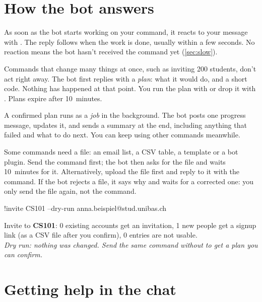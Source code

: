 \section{How the bot answers}
\label{sec:answers}

\begin{description}[style=nextline,leftmargin=1.5em,font=\normalfont\bfseries]
  \item[\robot\ The robot reaction]
    As soon as the bot starts working on your command, it reacts to your message with
    \robot. The reply follows when the work is done, usually within a few seconds.
    No reaction means the bot hasn't received the command yet (\autoref{sec:slow}).
  \item[Plans and \cmd{!confirm}]
    Commands that change many things at once, such as inviting 200 students, don't act
    right away. The bot first replies with a \emph{plan}: what it would do, and a short
    code. Nothing has happened at that point. You run the plan with  or
    drop it with . Plans expire after 10~minutes.
  \item[Jobs]
    A confirmed plan runs as a \emph{job} in the background. The bot posts one progress
    message, updates it, and sends a summary at the end, including anything that failed
    and what to do next. You can keep using other commands meanwhile.
  \item[Files]
    Some commands need a file: an email list, a CSV table, a template or a bot plugin.
    Send the command first; the bot then asks for the file and waits 10~minutes for it.
    Alternatively, upload the file first and reply to it with the command. If the bot
    rejects a file, it says why and waits for a corrected one: you only send the file
    again, not the command.
\end{description}

\begin{you}
!invite CS101 --dry-run
anna.beispiel@stud.unibas.ch
\end{you}
\begin{botreply}
Invite to \textbf{CS101}: 0 existing accounts get an invitation, 1 new people get a signup
link (as a CSV file after you confirm), 0 entries are not usable.\\[4pt]
\emph{Dry run: nothing was changed. Send the same command without  to get a
plan you can confirm.}
\end{botreply}

\section{Getting help in the chat}

